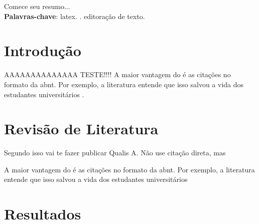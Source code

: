\documentclass[
	article,
	12pt,
	oneside,
	a4paper,
	english,
	brazil
	]{abntex2}
\begin{document}
\maketitle



\begin{resumoumacoluna}
 Comece seu resumo... \\
 
 \textbf{Palavras-chave}: latex. \abnTeX. editoração de texto.
\end{resumoumacoluna}

\textual
\section{Introdução}


AAAAAAAAAAAAAA TESTE!!!! A maior vantagem do \abnTeX é as citações no formato da abnt. Por exemplo, a literatura entende que isso salvou a vida dos estudantes universitários \cite{Abreu1999}.

\section{Revisão de Literatura}
Segundo  isso vai te fazer publicar Qualis A. Não use citação direta, mas

\begin{citacao}
A maior vantagem do \abnTeX é as citações no formato da abnt. Por exemplo, a literatura entende que isso salvou a vida dos estudantes universitários \cite{Abreu1999}
\end{citacao}


\section{Resultados}


\end{document}
